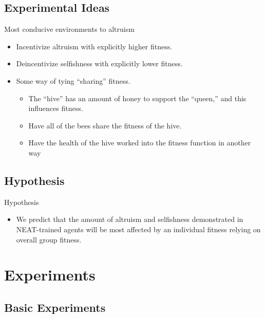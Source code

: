 \documentclass{beamer}
\begin{document}
    \subsection{Experimental Ideas}
    \begin{frame}{Most conducive environments to altruism}
        \begin{itemize}
            \item Incentivize altruism with explicitly higher fitness.
            \item Deincentivize selfishness with explicitly lower fitness.

            \item Some way of tying ``sharing'' fitness.
            \begin{itemize}
                \item The ``hive'' has an amount of honey to support the ``queen,'' and this 
                      influences fitness.
                \item Have all of the bees share the fitness of the hive.
                \item Have the health of the hive worked into the fitness function in another way
            \end{itemize}
        \end{itemize}
    \end{frame}


    \subsection{Hypothesis}
    \begin{frame}{Hypothesis}
            \begin{itemize}
                    \item We predict that the amount of altruism and selfishness demonstrated in 
                          NEAT-trained agents will be most affected by an individual fitness relying
                          on overall group fitness.

            \end{itemize}
    \end{frame}

    \section{Experiments}

    \subsection{Basic Experiments}
\end{document}
